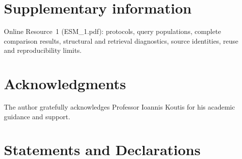 \documentclass[pdflatex,iicol,sn-basic,Numbered]{sn-jnl}
\begin{document}
\backmatter
\section*{Supplementary information}
Online Resource~1 (ESM\_1.pdf): protocols, query populations, complete comparison results, structural and retrieval diagnostics, source identities, reuse and reproducibility limits.

\ifdefined\AnonymousVersion\else
\section*{Acknowledgments}
The author gratefully acknowledges Professor Ioannis Koutis for his academic guidance and support.
\fi

\section*{Statements and Declarations}


\end{document}

